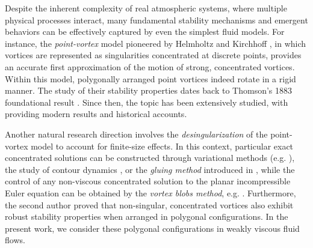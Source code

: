 \documentclass[11pt,reqno,a4paper]{amsart}
\newcommand{\1}{\mathbbm{1}}
\theoremstyle{definition}
\theoremstyle{definition}
\numberwithin{equation}{section}
\begin{document}
Despite the inherent complexity of real atmospheric systems, where multiple physical processes interact, many fundamental stability mechanisms and emergent behaviors can be effectively captured by even the simplest fluid models. For instance, the \emph{point-vortex} model pioneered by Helmholtz \cite{Helmholtz_1858} and Kirchhoff \cite{kirchhoff1876vorlesungen}, in which  vortices are represented as singularities concentrated at discrete points, provides an accurate first approximation of the motion of strong, concentrated vortices. Within this model, polygonally arranged point vortices indeed rotate in a rigid manner. The study of their stability properties dates back to Thomson's 1883 foundational result \cite{thomson1883treatise}.   Since then, the topic has been extensively studied, with \cite{CabSch1999,aref2002vortex} providing modern results and historical accounts.

Another natural research direction involves the \emph{desingularization} of the point-vortex model to account for finite-size effects. In this context, particular exact concentrated solutions can be constructed through variational methods (e.g. \cite{Turkington_1985,Cao25}), the study of contour dynamics \cite{HmMa17,Hassainia25,hassainia2024desingularization}, or the \emph{gluing method} introduced in \cite{Davila20}, while the control of any non-viscous concentrated solution to the planar incompressible Euler equation can be obtained by the \emph{vortex blobs method}, e.g. \cite{MarPul84, Butta18}.
 Furthermore, the second author \cite{Donati_2025_Crystal} proved that non-singular, concentrated vortices also exhibit robust stability properties when arranged in polygonal configurations. In the present work, we consider these polygonal configurations in weakly viscous fluid flows.
\end{document}
